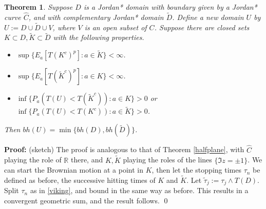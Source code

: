 \documentclass[a4paper, oneside, 12pt]{amsart}
\newcommand{\RR}{\mathbb{R}}
\newcommand{\m}{\wedge}
\newtheorem{theorem}{Theorem}[section]
\begin{document}
\begin{theorem}
    Suppose $D$ is a Jordan* domain with boundary given by a Jordan* curve $\hat C$, and with complementary Jordan* domain $\tilde D$. Define a new domain $U$ by $U:=D \cup \tilde D \cup V$, where $V$ is an open subset of $C$. Suppose there are closed sets $K \subset D, \tilde K \subset \tilde D$ with the following properties.

    \begin{itemize}
        \item $\sup\{E_a[T(K^c)^p] : a \in \tilde K\} < \infty$.
        \item $\sup\{E_a[T(\tilde K^c)^p] : a \in K\} < \infty$.
        \item $\inf\{P_a(T(U)<T(\tilde K^c)): a \in K\} > 0$ or $\inf\{P_a(T(U)<T(K^c)): a \in \tilde K\} > 0$.
    \end{itemize}

    Then $bh(U) = \min\{bh(D), bh(\tilde D)\}$.
\end{theorem}

{\bf Proof:} (sketch) The proof is analogous to that of Theorem \ref{halfplane}, with $\hat C$ playing the role of $\RR$ there, and $K, \tilde K$ playing the roles of the lines $\{\Im{z} = \pm 1\}$. We can start the Brownian motion at a point in $K$, then let the stopping times $\tau_n$ be defined as before, the successive hitting times of $K$ and $\tilde K$. Let $\tilde{\tau}_j := \tau_j \m T(D)$. Split $\tau_n$ as in \eqref{viking}, and bound in the same way as before. This results in a convergent geometric sum, and the result follows. \qed \\
\end{document}

